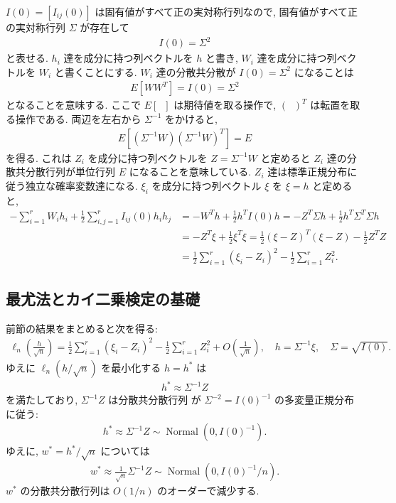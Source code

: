 \documentclass[12pt,twoside]{jarticle}
\theoremstyle{jplain}
\theoremstyle{jplain}
\theoremstyle{jplain}
\numberwithin{theorem}{section}
\numberwithin{equation}{section}
\numberwithin{figure}{section}
\numberwithin{table}{section}
\begin{document}
$I(0)=[I_{ij}(0)]$ は固有値がすべて正の実対称行列なので,
固有値がすべて正の実対称行列 $\Sigma$ が存在して
\begin{align*}
  I(0) = \Sigma^2
\end{align*}
と表せる. $h_i$ 達を成分に持つ列ベクトルを $h$ と書き,
$W_i$ 達を成分に持つ列ベクトルを $W_i$ と書くことにする.
$W_i$ 達の分散共分散が $I(0)=\Sigma^2$ になることは
\begin{align*}
  E[WW^T] = I(0) = \Sigma^2
\end{align*}
となることを意味する.
ここで $E[\;\;]$ は期待値を取る操作で, $(\;\;)^T$ は転置を取る操作である.
両辺を左右から $\Sigma^{-1}$ をかけると,
\begin{align*}
  E[(\Sigma^{-1}W)(\Sigma^{-1}W)^T] = E
\end{align*}
を得る. これは $Z_i$ を成分に持つ列ベクトルを $Z=\Sigma^{-1}W$ と定めると
$Z_i$ 達の分散共分散行列が単位行列 $E$ になることを意味している.
$Z_i$ 達は標準正規分布に従う独立な確率変数達になる.
$\xi_i$ を成分に持つ列ベクトル $\xi$ を $\xi= h$ と定めると,
\begin{align*}
  -\sum_{i=1}^r W_i h_i
  + \frac{1}{2}\sum_{i,j=1}^r I_{ij}(0) h_i h_j
  &
  = - W^T h + \frac{1}{2} h^T I(0) h
  = - Z^T\Sigma h + \frac{1}{2} h^T\Sigma^T\Sigma h
  \\ &
  = - Z^T\xi + \frac{1}{2}\xi^T\xi
  = \frac{1}{2}(\xi-Z)^T(\xi-Z) - \frac{1}{2}Z^T Z
  \\ &
  = \frac{1}{2}\sum_{i=1}^r (\xi_i-Z_i)^2
  - \frac{1}{2}\sum_{i=1}^r Z_i^2.
\end{align*}

\subsection{最尤法とカイ二乗検定の基礎}

前節の結果をまとめると次を得る:
\begin{align*}
  \ell_n\left(\frac{h}{\sqrt{n}}\right)
  = \frac{1}{2}\sum_{i=1}^r (\xi_i-Z_i)^2
  - \frac{1}{2}\sum_{i=1}^r Z_i^2
  +O\left(\frac{1}{\sqrt{n}}\right),
  \quad
  h = \Sigma^{-1}\xi, \quad
  \Sigma = \sqrt{I(0)}.
\end{align*}
ゆえに $\ell_n(h/\sqrt{n})$ を最小化する $h=h^*$ は
\begin{align*}
  h^* \approx \Sigma^{-1} Z
\end{align*}
を満たしており, $\Sigma^{-1} Z$ は分散共分散行列
が $\Sigma^{-2} = I(0)^{-1}$ の多変量正規分布に従う:
\begin{align*}
  h^*
  \approx \Sigma^{-1}Z
  \sim \operatorname{Normal}(0,I(0)^{-1}).
\end{align*}
ゆえに, $w^*=h^*/\sqrt{n}$ については
\begin{align*}
  w^*
  \approx \frac{1}{\sqrt{n}}\Sigma^{-1}Z
  \sim \operatorname{Normal}(0, I(0)^{-1}/n).
\end{align*}
$w^*$ の分散共分散行列は $O(1/n)$ のオーダーで減少する.
\end{document}
